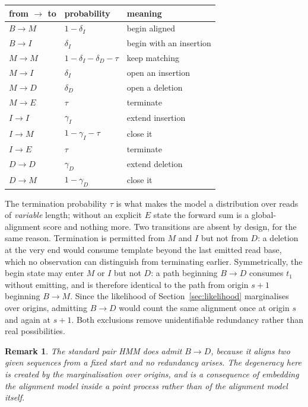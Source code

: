 \documentclass[11pt]{article}
\newtheorem{remark}{Remark}
\begin{document}
\begin{center}
\begin{tabular}{lll}
\toprule
from $\to$ to & probability & meaning \\
\midrule
$B \to M$ & $1-\delta_I$ & begin aligned \\
$B \to I$ & $\delta_I$ & begin with an insertion \\
$M \to M$ & $1-\delta_I-\delta_D-\tau$ & keep matching \\
$M \to I$ & $\delta_I$ & open an insertion \\
$M \to D$ & $\delta_D$ & open a deletion \\
$M \to E$ & $\tau$ & terminate \\
$I \to I$ & $\gamma_I$ & extend insertion \\
$I \to M$ & $1-\gamma_I-\tau$ & close it \\
$I \to E$ & $\tau$ & terminate \\
$D \to D$ & $\gamma_D$ & extend deletion \\
$D \to M$ & $1-\gamma_D$ & close it \\
\bottomrule
\end{tabular}
\end{center}

The termination probability $\tau$ is what makes the model a distribution over
reads of \emph{variable} length; without an explicit $E$ state the forward sum
is a global-alignment score and nothing more.  Two transitions are absent by design, for the same reason.  Termination is
permitted from $M$ and $I$ but not from $D$: a deletion at the very end would
consume template beyond the last emitted read base, which no observation can
distinguish from terminating earlier.  Symmetrically, the begin state may enter
$M$ or $I$ but not $D$: a path beginning $B \to D$ consumes $t_1$ without
emitting, and is therefore identical to the path from origin $s+1$ beginning
$B \to M$.  Since the likelihood of Section~\ref{sec:likelihood} marginalises
over origins, admitting $B \to D$ would count the same alignment once at origin
$s$ and again at $s+1$.  Both exclusions remove unidentifiable redundancy
rather than real possibilities.

\begin{remark}
The standard pair HMM does admit $B \to D$, because it aligns two given
sequences from a fixed start and no redundancy arises.  The degeneracy here is
created by the marginalisation over origins, and is a consequence of embedding
the alignment model inside a point process rather than of the alignment model
itself.
\end{remark}
\end{document}
